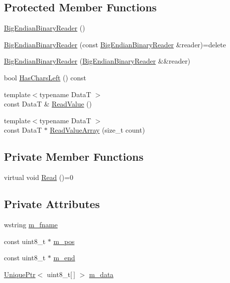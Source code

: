 \subsection*{Protected Member Functions}
\begin{DoxyCompactItemize}
\item 
\hyperlink{classmage_1_1_big_endian_binary_reader_a1fd0dbee6950a8cb04aa399f0cdbaf2a}{Big\+Endian\+Binary\+Reader} ()
\item 
\hyperlink{classmage_1_1_big_endian_binary_reader_a9d490263268290217ae4f2f06e0699c4}{Big\+Endian\+Binary\+Reader} (const \hyperlink{classmage_1_1_big_endian_binary_reader}{Big\+Endian\+Binary\+Reader} \&reader)=delete
\item 
\hyperlink{classmage_1_1_big_endian_binary_reader_a3cb2fbd205854cf69c36054a2003e80e}{Big\+Endian\+Binary\+Reader} (\hyperlink{classmage_1_1_big_endian_binary_reader}{Big\+Endian\+Binary\+Reader} \&\&reader)
\item 
bool \hyperlink{classmage_1_1_big_endian_binary_reader_a312a8ec7497a8056695b0345115039bd}{Has\+Chars\+Left} () const
\item 
{\footnotesize template$<$typename DataT $>$ }\\const DataT \& \hyperlink{classmage_1_1_big_endian_binary_reader_a036399c5d3099a4e617127acb110ccdf}{Read\+Value} ()
\item 
{\footnotesize template$<$typename DataT $>$ }\\const DataT $\ast$ \hyperlink{classmage_1_1_big_endian_binary_reader_aa79d97deb6060a6c1015c8f2891ac6da}{Read\+Value\+Array} (size\+\_\+t count)
\end{DoxyCompactItemize}
\subsection*{Private Member Functions}
\begin{DoxyCompactItemize}
\item 
virtual void \hyperlink{classmage_1_1_big_endian_binary_reader_af072965dea0319d6366b21cc6562bbf9}{Read} ()=0
\end{DoxyCompactItemize}
\subsection*{Private Attributes}
\begin{DoxyCompactItemize}
\item 
wstring \hyperlink{classmage_1_1_big_endian_binary_reader_a0f836aec582a59f156b64bffb9653e41}{m\+\_\+fname}
\item 
const uint8\+\_\+t $\ast$ \hyperlink{classmage_1_1_big_endian_binary_reader_ad5f1d1af53b4863cbe1f3677492dd978}{m\+\_\+pos}
\item 
const uint8\+\_\+t $\ast$ \hyperlink{classmage_1_1_big_endian_binary_reader_a87f169955c550884ced880e646d22494}{m\+\_\+end}
\item 
\hyperlink{namespacemage_a8c307fbcc33bce9b7f2aa4c26c3b95cf}{Unique\+Ptr}$<$ uint8\+\_\+t\mbox{[}$\,$\mbox{]} $>$ \hyperlink{classmage_1_1_big_endian_binary_reader_a22cf45ba63fdf09755041a9864b6b266}{m\+\_\+data}
\end{DoxyCompactItemize}


